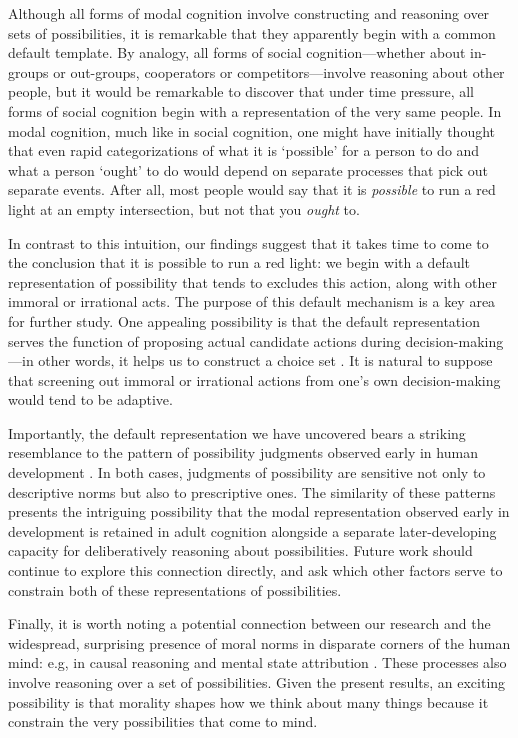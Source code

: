\documentclass[9pt,twocolumn,twoside]{pnas-new}
\begin{document}
Although all forms of modal cognition involve constructing and reasoning over sets of possibilities, it is remarkable that they apparently begin with a common default template. By analogy, all forms of social cognition---whether about in-groups or out-groups, cooperators or competitors---involve reasoning about other people, but it would be remarkable to discover that under time pressure, all forms of social cognition begin with a representation of the very same people.  In modal cognition, much like in social cognition, one might have initially thought that even rapid categorizations of what it is `possible' for a person to do and what a person `ought' to do would depend on separate processes that pick out separate events. After all, most people would say that it is \emph{possible} to run a red light at an empty intersection, but not that you \emph{ought} to.

In contrast to this intuition, our findings suggest that it takes time to come to the conclusion that it is possible to run a red light: we begin with a default representation of possibility that tends to excludes this action, along with other immoral or irrational acts. The purpose of this default mechanism is a key area for further study. One appealing possibility is that the default representation serves the function of proposing actual candidate actions during decision-making---in other words, it helps us to construct a choice set \citep{ben1995discrete}. It is natural to suppose that screening out immoral or irrational actions from one's own decision-making would tend to be adaptive.

Importantly, the default representation we have uncovered bears a striking resemblance to the pattern of possibility judgments observed early in human development \citep{phillips2016do,shtulman2016differentiating,shtulman2007improbable,kalish1998reasons}. In both cases, judgments of possibility are sensitive not only to descriptive norms but also to prescriptive ones. The similarity of these patterns presents the intriguing possibility that the modal representation observed early in development is retained in adult cognition alongside a separate later-developing capacity for deliberatively reasoning about possibilities. Future work should continue to explore this connection directly, and ask which other factors serve to constrain both of these representations of possibilities.

Finally, it is worth noting a potential connection between our research and the widespread, surprising presence of moral norms in disparate corners of the human mind: e.g, in causal reasoning and mental state attribution \citep{Knobe2003,Hitchcock2009,halpern2015graded,kominsky2015causal,phillips2015unifying}. These processes also involve reasoning over a set of possibilities. Given the present results, an exciting possibility is that morality shapes how we think about many things because it constrain the very possibilities that come to mind.
\end{document}
